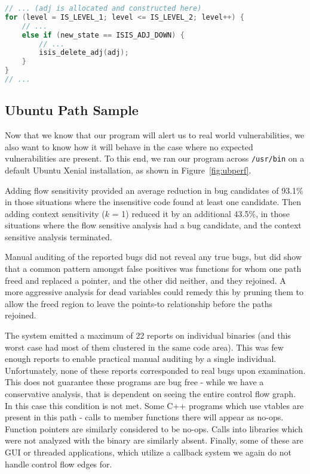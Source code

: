 \begin{lstlisting}[language=C, float=t, caption={\texttt{isisd} Vulnerability}, label=lst:isisd-gueb]
// ... (adj is allocated and constructed here)
for (level = IS_LEVEL_1; level <= IS_LEVEL_2; level++) {
	// ...
	else if (new_state == ISIS_ADJ_DOWN) {
		// ...
		isis_delete_adj(adj);
	}
}
// ...
\end{lstlisting}


\subsection{Ubuntu Path Sample}
Now that we know that our program will alert us to real world vulnerabilities, we also want to know how it will behave in the case where no expected vulnerabilities are present.
To this end, we ran our program across \texttt{/usr/bin} on a default Ubuntu Xenial installation, as shown in Figure~\ref{fig:ubperf}.

Adding flow sensitivity provided an average reduction in bug candidates of 93.1\% in those situations where the insensitive code found at least one candidate.
Then adding context sensitivity ($k$ = 1) reduced it by an additional 43.5\%, in those situations where the flow sensitive analysis had a bug candidate, and the context sensitive analysis terminated.

Manual auditing of the reported bugs did not reveal any true bugs, but did show that a common pattern amongst false positives was functions for whom one path freed and replaced a pointer, and the other did neither, and they rejoined.
A more aggressive analysis for dead variables could remedy this by pruning them to allow the freed region to leave the points-to relationship before the paths rejoined.

The system emitted a maximum of 22 reports on individual binaries (and this worst case had most of them clustered in the same code area).
This was few enough reports to enable practical manual auditing by a single individual.
Unfortunately, none of these reports corresponded to real bugs upon examination.
This does not guarantee these programs are bug free - while we have a conservative analysis, that is dependent on seeing the entire control flow graph.
In this case this condition is not met.
Some C++ programs which use vtables are present in this path - calls to member functions there will appear as no-ops.
Function pointers are similarly considered to be no-ops.
Calls into libraries which were not analyzed with the binary are similarly absent.
Finally, some of these are GUI or threaded applications, which utilize a callback system we again do not handle control flow edges for.
